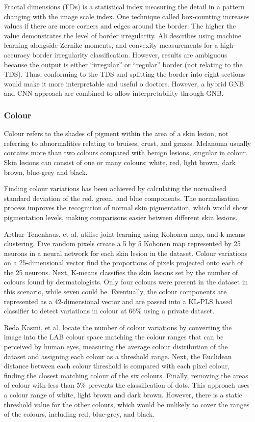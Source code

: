 Fractal dimensions (FDs) is a statistical index measuring the detail in a pattern changing with the image scale index. One technique called box-counting increases values if there are more corners and edges around the border. The higher the value demonstrates the level of border irregularity. Ali describes using machine learning alongside Zernike moments, and convexity measurements for a high-accuracy border irregularity classification\cite{Ali2020b}. However, results are ambiguous because the output is either ``irregular'' or ``regular'' border (not relating to the TDS). Thus, conforming to the TDS and splitting the border into eight sections would make it more interpretable and useful o doctors. However, a hybrid GNB and CNN approach are combined to allow interpretability through GNB.

\subsubsection{Colour}
Colour refers to the shades of pigment within the area of a skin lesion, not referring to abnormalities relating to bruises, crust, and grazes. Melanoma usually contains more than two colours compared with benign lesions, singular in colour. Skin lesions can consist of one or many colours: white, red, light brown, dark brown, blue-grey and black.

Finding colour variations has been achieved by calculating the normalised standard deviation of the red, green, and blue components\cite{She2007}. The normalisation process improves the recognition of normal skin pigmentation, which would show pigmentation levels, making comparisons easier between different skin lesions.

Arthur Tenenhaus, et al. utilise joint learning using Kohonen map, and k-means clustering\cite{Tenenhaus2010}. Five random pixels create a 5 by 5 Kohonen map represented by 25 neurons in a neural network for each skin lesion in the dataset. Colour variations on a 25-dimensional vector find the proportions of pixels projected onto each of the 25 neurons. Next, K-means classifies the skin lesions set by the number of colours found by dermatologists. Only four colours were present in the dataset in this scenario, while seven could be. Eventually, the colour components are represented as a 42-dimensional vector and are passed into a KL-PLS based classifier to detect variations in colour at 66\% using a private dataset.

Reda Kasmi, et al. locate the number of colour variations by converting the image into the LAB colour space matching the colour ranges that can be perceived by human eyes\cite{Myridis2014a}, measuring the average colour distribution of the dataset and assigning each colour as a threshold range. Next, the Euclidean distance between each colour threshold is compared with each pixel colour\cite{Kasmi2016}, finding the closest matching colour of the six colours. Finally, removing the areas of colour with less than 5\% prevents the classification of dots. This approach uses a colour range of white, light brown and dark brown. However, there is a static threshold value for the other colours, which would be unlikely to cover the ranges of the colours, including red, blue-grey, and black.

